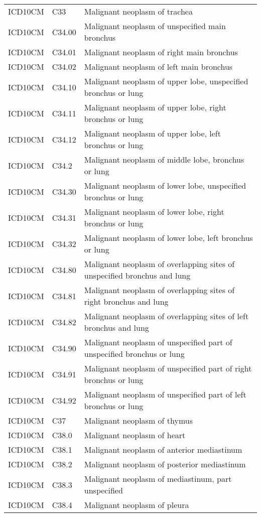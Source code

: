 \begin{longtable}{p{}p{}p{}}
  ICD10CM & C33 & Malignant neoplasm of trachea \\ 
  ICD10CM & C34.00 & Malignant neoplasm of unspecified main bronchus \\ 
  ICD10CM & C34.01 & Malignant neoplasm of right main bronchus \\ 
  ICD10CM & C34.02 & Malignant neoplasm of left main bronchus \\ 
  ICD10CM & C34.10 & Malignant neoplasm of upper lobe, unspecified bronchus or lung \\ 
  ICD10CM & C34.11 & Malignant neoplasm of upper lobe, right bronchus or lung \\ 
  ICD10CM & C34.12 & Malignant neoplasm of upper lobe, left bronchus or lung \\ 
  ICD10CM & C34.2 & Malignant neoplasm of middle lobe, bronchus or lung \\ 
  ICD10CM & C34.30 & Malignant neoplasm of lower lobe, unspecified bronchus or lung \\ 
  ICD10CM & C34.31 & Malignant neoplasm of lower lobe, right bronchus or lung \\ 
  ICD10CM & C34.32 & Malignant neoplasm of lower lobe, left bronchus or lung \\ 
  ICD10CM & C34.80 & Malignant neoplasm of overlapping sites of unspecified bronchus and lung \\ 
  ICD10CM & C34.81 & Malignant neoplasm of overlapping sites of right bronchus and lung \\ 
  ICD10CM & C34.82 & Malignant neoplasm of overlapping sites of left bronchus and lung \\ 
  ICD10CM & C34.90 & Malignant neoplasm of unspecified part of unspecified bronchus or lung \\ 
  ICD10CM & C34.91 & Malignant neoplasm of unspecified part of right bronchus or lung \\ 
  ICD10CM & C34.92 & Malignant neoplasm of unspecified part of left bronchus or lung \\ 
  ICD10CM & C37 & Malignant neoplasm of thymus \\ 
  ICD10CM & C38.0 & Malignant neoplasm of heart \\ 
  ICD10CM & C38.1 & Malignant neoplasm of anterior mediastinum \\ 
  ICD10CM & C38.2 & Malignant neoplasm of posterior mediastinum \\ 
  ICD10CM & C38.3 & Malignant neoplasm of mediastinum, part unspecified \\ 
  ICD10CM & C38.4 & Malignant neoplasm of pleura \\ 

\end{longtable}
